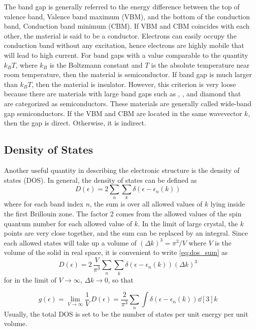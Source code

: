 The band gap is generally referred to the energy difference between the top of valence band, Valence band maximum (VBM),  and the bottom of the conduction band, Conduction band minimum (CBM). If VBM and CBM coincides with each other, the material is said to be a conductor. Electrons can easily occupy the conduction band without any excitation, hence electrons are highly mobile that will lead to high current. For band gaps with a value comparable to the quantity $k_B T$, where $k_B$ is the Boltzmann constant and  $T$ is the absolute temperature near room temperature, then the material is semiconductor. If band gap is much larger than $k_B T$, then the material is insulator. However, this criterion is very loose because there are materials with large band gaps such as , , and diamond that are categorized as semiconductors. These materials are generally called wide-band gap semiconductors. If the VBM and CBM are located in the same wavevector $k$, then the gap is direct. Otherwise, it is indirect.

\subsection{Density of States}
Another useful quantity in describing the electronic structure is the density of states (DOS). In general, the density of states can be defined as \citep{Ashcroft1976}
\begin{equation} \label{eq:dos_sum}
	D(\epsilon) = 2 \sum_n \sum_k \delta(\epsilon - \epsilon_n(k))
\end{equation}
where for each band index $n$, the sum is over all allowed values of $k$ lying inside the first Brillouin zone. The factor 2 comes from the allowed values of the spin quantum number for each allowed value of $k$. In the limit of large crystal, the $k$ points are very close together, and the sum can be replaced by an integral. Since each allowed states will take up a volume of $ (\Delta k)^3 = \pi^3/V$ where $V$ is the volume of the solid in real space, it is convenient to write \eqref{eq:dos_sum} as
\begin{equation} \label{eq:dos_int}
	D(\epsilon) = 2\, \frac{V}{\pi^3} \sum_n \sum_k \delta(\epsilon - \epsilon_n(k)) (\Delta k)^3
\end{equation}
for  in the limit of $V \rightarrow \infty $, $\Delta k \rightarrow 0$, so that

\begin{equation} \label{eq:dos_lim}
	g(\epsilon) = \lim_{V \to \infty} \frac{1}{V}\, D(\epsilon) = \frac{2}{\pi^3} \sum_n \int \delta(\epsilon - \epsilon_n(k)) \dd[3]{k}
\end{equation}
Usually, the total DOS is set to be the number of states per unit energy per unit volume.


